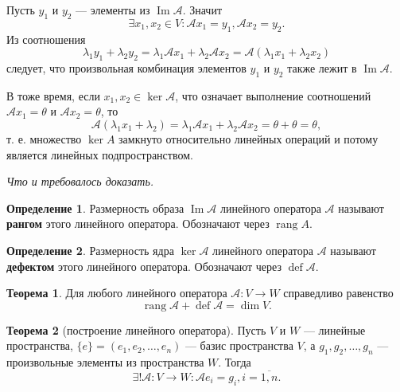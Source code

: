 \documentclass[a5paper, 11pt]{extbook}
\theoremstyle{definition}
\newtheorem{theorem}{Теорема}[section]
\theoremstyle{definition}
\newtheorem{definition}{Определение}[section]
\theoremstyle{definition}
\newcommand{\newpar}{$ $\par\nobreak\ignorespaces}
\renewenvironment{proof}{{\noindent\bfseries Доказательство.}}{\smallskip\newpar \hfill\textit{Что и требовалось доказать.}}
\DeclareMathOperator{\rang}{rang}
\DeclareMathOperator{\Ima}{Im}
\DeclareMathOperator{\defect}{def}
\begin{document}
\begin{proof}
    Пусть \(y_1\) и \(y_2\) — элементы из \(\Ima \mathcal{A}\). Значит
    \[
        \exists x_1, x_2 \in V: \mathcal{A} x_1 = y_1, \mathcal{A} x_2 = y_2.
    \]
    Из соотношения
    \[
        \lambda_1 y_1 + \lambda_2 y_2 =
        \lambda_1 \mathcal{A} x_1 + \lambda_2 \mathcal{A} x_2 =
        \mathcal{A} (\lambda_1 x_1 + \lambda_2 x_2)
    \]
    следует, что произвольная комбинация элементов \(y_1\) и \(y_2\) также лежит в \(\Ima \mathcal{A}\).

    В тоже время, если \(x_1, x_2 \in \ker \mathcal{A}\), что означает выполнение соотношений \(\mathcal{A} x_1 = \theta\) и \(\mathcal{A} x_2 = \theta\), то
    \[
        \mathcal{A} (\lambda_1 x_1 + \lambda_2) = \lambda_1 \mathcal{A} x_1 + \lambda_2 \mathcal{A} x_2 = \theta + \theta = \theta,
    \]
    т. е. множество \(\ker A\) замкнуто относительно линейных операций и потому является линейных подпространством.
\end{proof}

\begin{definition}
    Размерность образа \(\Ima \mathcal{A}\) линейного оператора \(\mathcal{A}\) называют \textbf{рангом} этого линейного оператора. Обозначают через \(\rang A\).
\end{definition}

\begin{definition}
    Размерность ядра \(\ker \mathcal{A}\) линейного оператора \(\mathcal{A}\) называют \textbf{дефектом} этого линейного оператора. Обозначают через \(\defect \mathcal{A}\).
\end{definition}

\begin{theorem}
    Для любого линейного оператора \(\mathcal{A}: V \to W\) справедливо равенство
    \[
        \rang \mathcal{A} + \defect \mathcal{A} = \dim V.
    \]
\end{theorem}

\begin{theorem}[построение линейного оператора]
    Пусть \(V\) и \(W\) — линейные пространства, \(\{e\} = (e_1, e_2, \ldots, e_n)\) — базис пространства \(V\), а \(g_1, g_2, \ldots, g_n\) — произвольные элементы из пространства \(W\). Тогда
    \[
        \exists! \mathcal{A}: V \to W : \mathcal{A} e_i = g_i, i = \overline{1, n}.
    \]
\end{theorem}
\end{document}
